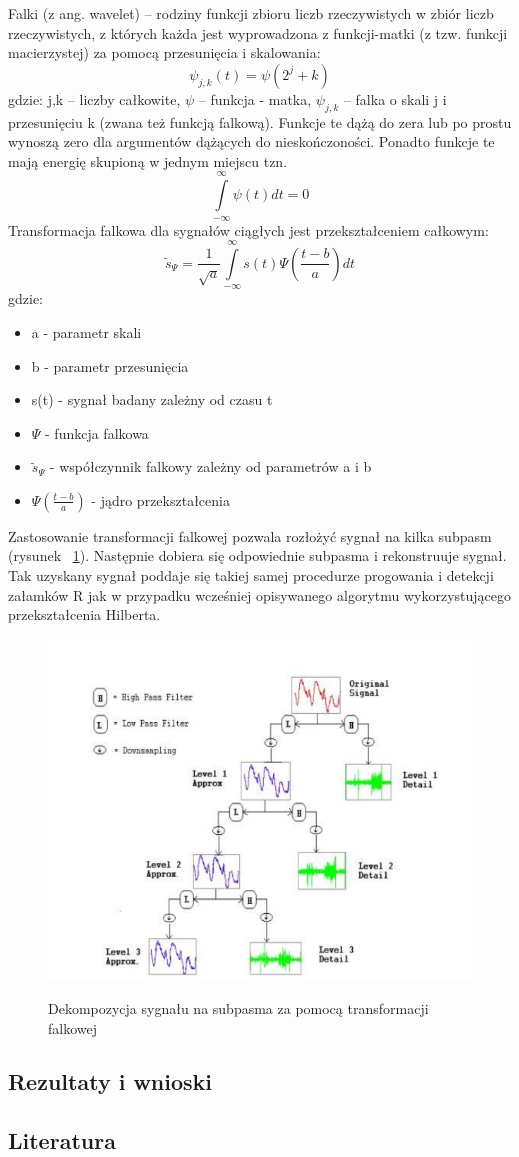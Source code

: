 Falki (z ang. wavelet) – rodziny funkcji zbioru liczb rzeczywistych w zbiór liczb rzeczywistych, z których każda jest wyprowadzona z funkcji-matki (z tzw. funkcji macierzystej) za pomocą przesunięcia i skalowania:
\begin{equation}
\psi_{j,k}(t)=\psi(2^j +k)
\end{equation}
gdzie: j,k – liczby całkowite, $\psi$ – funkcja - matka, $\psi_{j,k}$ – falka o skali j i przesunięciu k (zwana też funkcją falkową). Funkcje te dążą do zera lub po prostu wynoszą zero dla argumentów dążących do nieskończoności. Ponadto funkcje te mają energię skupioną w jednym miejscu tzn.
\begin{equation}
\int\limits_{-\infty}^{\infty} \psi(t)dt=0
\end{equation}
Transformacja falkowa dla sygnałów ciągłych jest przekształceniem całkowym:
\begin{equation}
\tilde{s}_{\Psi}=\frac{1}{\sqrt{a}}\int\limits_{-\infty}^{\infty}s(t)\Psi(\frac{t-b}{a})dt
\end{equation}
gdzie:
\begin{itemize}
\item a - parametr skali
\item b - parametr przesunięcia
\item s(t) - sygnał badany zależny od czasu t
\item $\Psi$ - funkcja falkowa
\item $\tilde{s} _\Psi$ - współczynnik falkowy zależny od parametrów a i b
\item $\Psi(\frac{t-b}{a})$ - jądro przekształcenia
\end{itemize}
Zastosowanie transformacji falkowej pozwala rozłożyć sygnał na kilka subpasm (rysunek ~\ref{fig:RP_WS}). Następnie dobiera się odpowiednie subpasma i rekonstruuje sygnał. Tak uzyskany sygnał poddaje się takiej samej procedurze progowania i detekcji załamków R jak w przypadku wcześniej opisywanego algorytmu wykorzystującego przekształcenia Hilberta.
\begin{figure}[H]
\centering
\includegraphics[scale=0.85]{R_PEAKS/img/wavelet_schema}
\label{fig:RP_WS}
\caption{Dekompozycja sygnału na subpasma za pomocą transformacji falkowej}
\end{figure}
\subsection{Rezultaty i wnioski}
\subsection{Literatura}